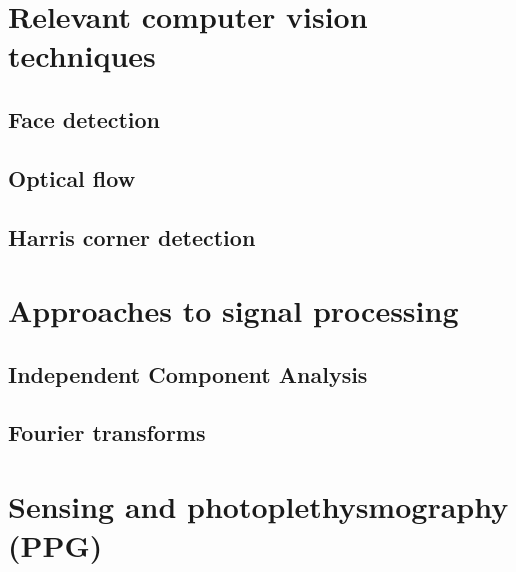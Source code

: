 
\section{Relevant computer vision techniques}
\subsection{Face detection}
\subsection{Optical flow}
\subsection{Harris corner detection}
\section{Approaches to signal processing}
\subsection{Independent Component Analysis}
\subsection{Fourier transforms}

\section{Sensing and photoplethysmography (PPG)}

